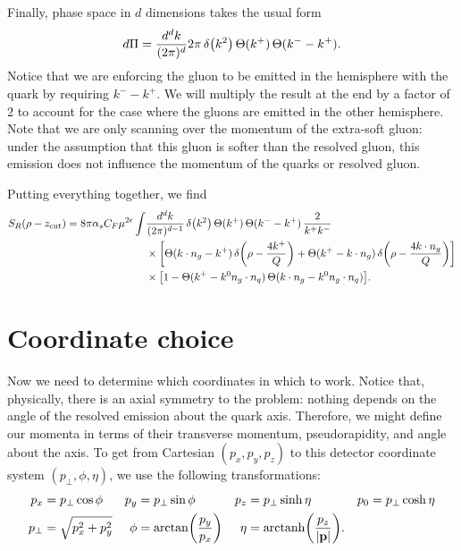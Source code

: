 \documentclass[11pt,twoside,reqno]{amsart}
\theoremstyle{plain}
\theoremstyle{remark}
\theoremstyle{definition}
\theoremstyle{remark}
\theoremstyle{definition}
\theoremstyle{definition}
\newcommand{\zcut}{z_\mathrm{cut}}
\newcommand{\arctanh}{\mathrm{arctanh}}
\begin{document}
	Finally, phase space in $d$ dimensions takes the usual form
	\begin{equation}
		d\Pi = \frac{d^d k}{(2\pi)^d} 2\pi\,\delta\qty(k^2)\,\Theta(k^+)\,\Theta(k^- - k^+).
	\end{equation}
	Notice that we are enforcing the gluon to be emitted in the hemisphere with the quark by requiring $k^- - k^+$. We will multiply the result at the end by a factor of $2$ to account for the case where the gluons are emitted in the other hemisphere. Note that we are only scanning over the momentum of the extra-soft gluon: under the assumption that this gluon is softer than the resolved gluon, this emission does not influence the momentum of the quarks or resolved gluon.

	Putting everything together, we find
	\begin{equation}\label{eq:soft integral}
	\begin{aligned}
		S_R(\rho - \zcut) = 8\pi\alpha_s C_F \mu^{2\epsilon} \int& \frac{d^d k}{(2\pi)^{d-1}} \, \delta\qty(k^2)\,\Theta(k^+)\,\Theta(k^- - k^+) \,\frac{2}{k^+ k^-} \\
		&\times \qty[\Theta(k\cdot n_g - k^+)\,\delta\qty(\rho - \frac{4k^+}{Q}) + \Theta(k^+ - k\cdot n_g)\,\delta\qty(\rho - \frac{4k\cdot n_g}{Q})] \\
		&\times \qty[1 - \Theta(k^+ - k^0 n_g \cdot n_q)\,\Theta(k \cdot n_g - k^0 n_g \cdot n_q)].
	\end{aligned}
	\end{equation}

\section{Coordinate choice}
	Now we need to determine which coordinates in which to work. Notice that, physically, there is an axial symmetry to the problem: nothing depends on the angle of the resolved emission about the quark axis. Therefore, we might define our momenta in terms of their transverse momentum, pseudorapidity, and angle about the axis. To get from Cartesian $(p_x, p_y, p_z)$ to this detector coordinate system $(p_\perp, \phi, \eta)$, we use the following transformations:
	\begin{equation}
	\begin{aligned}
		p_x &= p_\perp \cos\phi & p_y &= p_\perp \sin\phi & p_z &= p_\perp \sinh\eta & p_0 &= p_\perp \cosh\eta \\
		p_\perp &= \sqrt{p_x^2 + p_y^2} & \phi &= \arctan(\frac{p_y}{p_x}) & \eta &= \arctanh\qty(\frac{p_z}{\abs{\vb{p}}}).
	\end{aligned}
	\end{equation}
\end{document}
